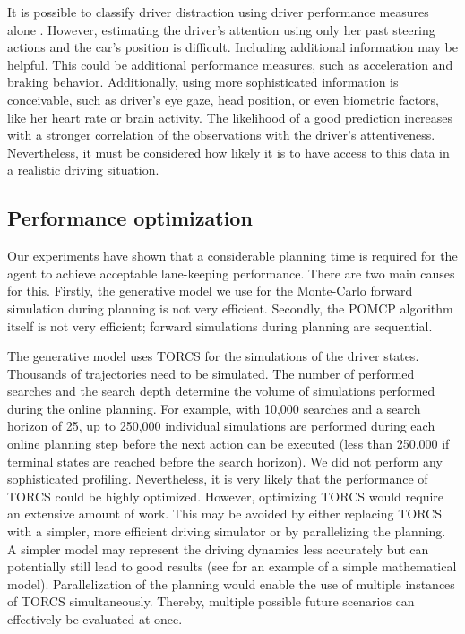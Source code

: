 It is possible to classify driver distraction using driver performance measures alone \parencite{dist-det-perf}. However, estimating the driver's attention using only her past steering actions and the car's position is difficult. Including additional information may be helpful. This could be additional performance measures, such as acceleration and braking behavior. Additionally, using more sophisticated information is conceivable, such as driver's eye gaze, head position, or even biometric factors, like her heart rate or brain activity. The likelihood of a good prediction increases with a stronger correlation of the observations with the driver's attentiveness. Nevertheless, it must be considered how likely it is to have access to this data in a realistic driving situation.

\subsection{Performance optimization}
\label{sec:perf_opt}

Our experiments have shown that a considerable planning time is required for the agent to achieve acceptable lane-keeping performance. There are two main causes for this. Firstly, the generative model we use for the Monte-Carlo forward simulation during planning is not very efficient. Secondly, the POMCP algorithm itself is not very efficient; forward simulations during planning are sequential.

The generative model uses TORCS for the simulations of the driver states. Thousands of trajectories need to be simulated. The number of performed searches and the search depth determine the volume of simulations performed during the online planning. For example, with 10,000 searches and a search horizon of 25, up to 250,000 individual simulations are performed during each online planning step before the next action can be executed (less than 250.000 if terminal states are reached before the search horizon). We did not perform any sophisticated profiling. Nevertheless, it is very likely that the performance of TORCS could be highly optimized. However, optimizing TORCS would require an extensive amount of work. This may be avoided by either replacing TORCS with a simpler, more efficient driving simulator or by parallelizing the planning. A simpler model may represent the driving dynamics less accurately but can potentially still lead to good results (see \cite{hitl_pomdp} for an example of a simple mathematical model). Parallelization of the planning would enable the use of multiple instances of TORCS simultaneously. Thereby, multiple possible future scenarios can effectively be evaluated at once.

